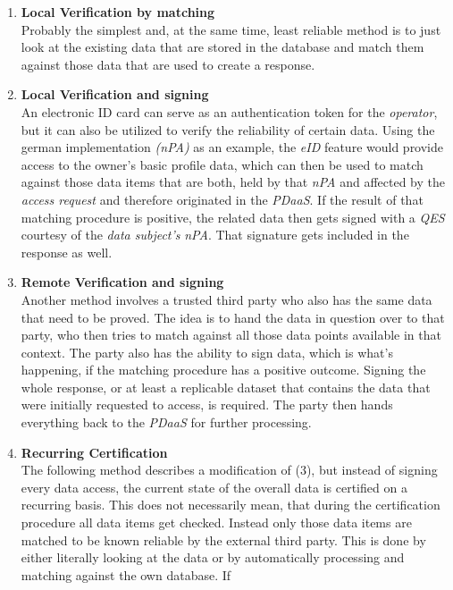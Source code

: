 \documentclass[12pt,english,a4paper,titlepage,cleardoublepage=empty,dottedtoc]{report}
\begin{document}
\begin{enumerate}
\def\labelenumi{(\arabic{enumi})}
\item
  \textbf{Local Verification by matching}\\
  Probably the simplest and, at the same time, least reliable method is
  to just look at the existing data that are stored in the database and
  match them against those data that are used to create a response.
\item
  \textbf{Local Verification and signing}\\
  An electronic ID card can serve as an authentication token for the
  \emph{operator}, but it can also be utilized to verify the reliability
  of certain data. Using the german implementation \emph{(nPA)} as an
  example, the \emph{eID} feature would provide access to the owner's
  basic profile data, which can then be used to match against those data
  items that are both, held by that \emph{nPA} and affected by the
  \emph{access request} and therefore originated in the \emph{PDaaS}. If
  the result of that matching procedure is positive, the related data
  then gets signed with a \emph{QES} courtesy of the \emph{data
  subject's} \emph{nPA}. That signature gets included in the response as
  well.
\item
  \textbf{Remote Verification and signing}\\
  Another method involves a trusted third party who also has the same
  data that need to be proved. The idea is to hand the data in question
  over to that party, who then tries to match against all those data
  points available in that context. The party also has the ability to
  sign data, which is what's happening, if the matching procedure has a
  positive outcome. Signing the whole response, or at least a replicable
  dataset that contains the data that were initially requested to
  access, is required. The party then hands everything back to the
  \emph{PDaaS} for further processing.
\item
  \textbf{Recurring Certification}\\
  The following method describes a modification of (3), but instead of
  signing every data access, the current state of the overall data is
  certified on a recurring basis. This does not necessarily mean, that
  during the certification procedure all data items get checked. Instead
  only those data items are matched to be known reliable by the external
  third party. This is done by either literally looking at the data or
  by automatically processing and matching against the own database. If

\end{enumerate}
\end{document}
